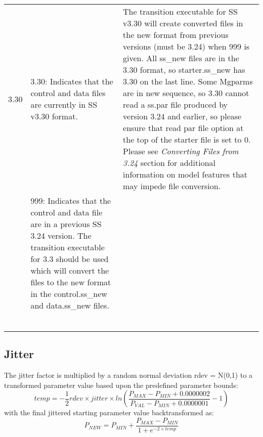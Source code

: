 \begin{landscape}
\begin{longtable}{p{3cm} p{7cm} p{11cm}}
 \hline
 \hypertarget{Convert}{3.30} & 3.30: Indicates that the control and data files are currently in SS v3.30 format. 
	 & \multirow{1}{1cm}[-0.1cm]{\parbox{11cm}{The transition executable for SS v3.30 will create converted files in the new format from previous versions (must be 3.24) when 999 is given.  All ss\_new files are in the 3.30 format, so starter.ss\_new has 3.30 on the last line.  Some Mgparms are in new sequence, so 3.30 cannot read a ss.par file produced by version 3.24 and earlier, so please ensure that read par file option at the top of the starter file is set to 0. Please see \hypertarget{ConvIssues} {\textit{Converting Files from 3.24} section for additional information on model features that may impede file conversion.}}}\\
     & \multirow{1}{1cm}[-0.1cm]{\parbox{7cm}{999: Indicates that the control and data file are in a previous SS 3.24 version.  The transition executable for 3.3 should be used which will convert the files to the new format in the control.ss\_new and data.ss\_new files.}}  & \\  
     & & \\  
	 & & \\
     & & \\
   	 & & \\
     & & \\
     & & \\	
\end{longtable}
\end{landscape}
\restoregeometry

\subsection{Jitter}
\hypertarget{Jitter}{}
The jitter factor is multiplied by a random normal deviation rdev = N(0,1) to a transformed parameter value based upon the predefined parameter bounds:
\begin{equation}
temp = -\frac{1}{2}rdev \times jitter \times ln(\frac{P_{MAX} - P_{MIN} + 0.0000002}{P_{VAL}-P_{MIN} + 0.0000001}-1)
\end{equation}
with the final jittered starting parameter value backtransformed as:
\begin{equation}
P_{NEW} = P_{MIN} + \frac{P_{MAX}-P_{MIN}}{1+e^{-2 \times temp}}
\end{equation}

\hypertarget{ConvIssues}{}
